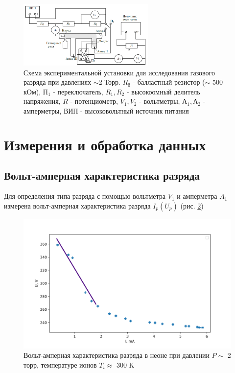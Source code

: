 \documentclass[a4paper,12pt]{article} %
\begin{document}
\begin{figure}[h!]
\begin{center}
\includegraphics[width=0.6\textwidth]{Установка}
\caption{Схема экспериментальной установки для исследования газового разряда при давлениях $\sim $2 Торр. $R_б$ - балластный резистор ($\sim $ 500 кОм), $П_1$ - переключатель, $R_1, R_2$ - высокоомный делитель напряжения, $R$ - потенциометр, $V_1, V_2$ - вольтметры, $А_1, А_2$ - амперметры, ВИП - высоковольтный источник питания} \label{установка}
\end{center}
\end{figure}

\section{Измерения и обработка данных}
\subsection{Вольт-амперная характеристика разряда}
Для определения типа разряда с помощью вольтметра $V_1$ и амперметра $A_1$ измерена вольт-амперная характеристика разряда $I_p(U_p)$ (рис. \ref{ВАХ_разряда})

\begin{figure}[h!]
\begin{center}
\includegraphics[width=\textwidth]{U(I)_discharge}
\caption{Вольт-амперная характеристика разряда в неоне при давлении $P \sim$ 2 торр, температуре ионов $T_i \approx $ 300 K} \label{ВАХ_разряда}
\end{center}
\end{figure}
\end{document}
